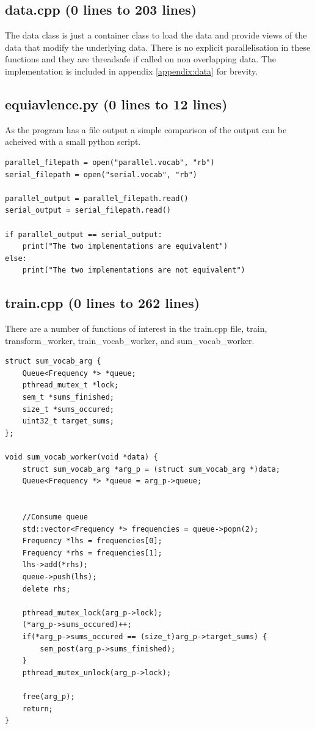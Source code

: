 \documentclass{article}
\begin{document}
\subsection{data.cpp (0 lines to 203 lines)}
The data class is just a container class to load the data and provide views of the data that modify the 
underlying data. There is no explicit parallelisation in these functions and they are threadsafe if called on 
non overlapping data. The implementation is included in appendix \ref{appendix:data} for brevity.

\subsection{equiavlence.py (0 lines to 12 lines)}
As the program has a file output a simple comparison of the output can be acheived with a small python script.

\begin{verbatim}
parallel_filepath = open("parallel.vocab", "rb")
serial_filepath = open("serial.vocab", "rb")

parallel_output = parallel_filepath.read()
serial_output = serial_filepath.read()

if parallel_output == serial_output:
    print("The two implementations are equivalent")
else:
    print("The two implementations are not equivalent")
\end{verbatim}

\subsection{train.cpp (0 lines to 262 lines)}

There are a number of functions of interest in the train.cpp file, train, transform\_worker, train\_vocab\_worker,
and sum\_vocab\_worker.

\begin{verbatim}
struct sum_vocab_arg {
    Queue<Frequency *> *queue;
    pthread_mutex_t *lock;
    sem_t *sums_finished;
    size_t *sums_occured;
    uint32_t target_sums;
};

void sum_vocab_worker(void *data) {
    struct sum_vocab_arg *arg_p = (struct sum_vocab_arg *)data;
    Queue<Frequency *> *queue = arg_p->queue;
    

    //Consume queue
    std::vector<Frequency *> frequencies = queue->popn(2);
    Frequency *lhs = frequencies[0];
    Frequency *rhs = frequencies[1];
    lhs->add(*rhs);
    queue->push(lhs);
    delete rhs;
    
    pthread_mutex_lock(arg_p->lock);
    (*arg_p->sums_occured)++;
    if(*arg_p->sums_occured == (size_t)arg_p->target_sums) {
        sem_post(arg_p->sums_finished);
    }
    pthread_mutex_unlock(arg_p->lock);

    free(arg_p);
    return;
}
\end{verbatim}
\end{document}
